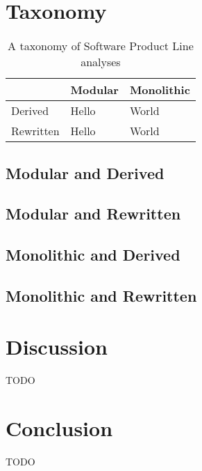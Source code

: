 \documentclass[sigplan]{acmart}
\begin{document}
\section{Taxonomy}

\begin{table}[t]
\begin{center}
\begin{tabular}{| l | l | l |}
\hline
	& Modular & Monolithic \\ \hline
Derived & Hello & World \\ \hline
Rewritten & Hello & World \\ \hline
\end{tabular}
\end{center}
\caption{A taxonomy of Software Product Line analyses}
\label{table:taxonomy}
\end{table}

\subsection{Modular and Derived}

\subsection{Modular and Rewritten}

\subsection{Monolithic and Derived}

\subsection{Monolithic and Rewritten}

\section{Discussion}
TODO

\section{Conclusion}
TODO


 
\end{document}

